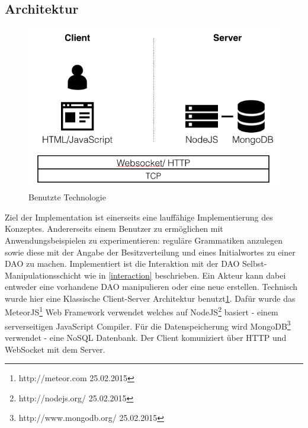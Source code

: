 \documentclass[a4paper,12pt]{report}
\begin{document}
\subsection*{Architektur}

\begin{figure}[ht]
    \centering
    \includegraphics[width=1\textwidth]{bilder/client-server.png}
    \caption{Benutzte Technologie}
    \label{client-server}
\end{figure}

Ziel der Implementation ist einerseits eine lauffähige Implementierung des Konzeptes. Andererseits einem Benutzer zu ermöglichen mit Anwendungsbeispielen zu experimentieren: reguläre Grammatiken anzulegen sowie diese mit der Angabe der Besitzverteilung und eines Initialwortes zu einer DAO zu machen.
Implementiert ist die Interaktion mit der DAO Selbst-Manipulationsschicht wie in \ref{interaction} beschrieben. Ein Akteur kann dabei entweder eine vorhandene DAO manipulieren oder eine neue erstellen. Technisch wurde hier eine Klassische Client-Server Architektur benutzt\ref{client-server}. Dafür wurde das MeteorJS\footnote{http://meteor.com 25.02.2015} Web Framework verwendet
welches auf NodeJS\footnote{http://nodejs.org/ 25.02.2015} basiert - einem serverseitigen JavaScript Compiler. Für die Datenspeicherung wird MongoDB\footnote{http://www.mongodb.org/ 25.02.2015} verwendet - eine NoSQL Datenbank. Der Client komuniziert über HTTP und WebSocket mit dem Server.

\end{document}
